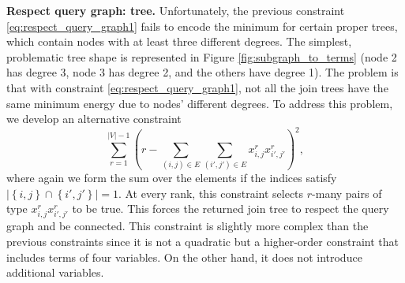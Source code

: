 \textbf{Respect query graph: tree.}
Unfortunately, the previous constraint \eqref{eq:respect_query_graph1} fails to encode the minimum for certain proper trees, which contain nodes with at least three different degrees. The simplest, problematic tree shape is represented in Figure \ref{fig:subgraph_to_terms} (node 2 has degree 3, node 3 has degree 2, and the others have degree 1). The problem is that with constraint \eqref{eq:respect_query_graph1}, not all the join trees have the same minimum energy due to nodes' different degrees. To address this problem, we develop an alternative constraint
\begin{equation*}
    \sum_{r = 1}^{|V| - 1} \left( r - \sum_{(i,j) \in E}\sum_{(i',j') \in E} x_{i,j}^{r}x_{i',j'}^{r}\right)^2,
\end{equation*}
where again we form the sum over the elements if the indices satisfy $|\left\{ i, j \right\} \cap \left\{ i', j' \right\}| = 1$. At every rank, this constraint selects $r$-many pairs of type $x_{i,j}^{r}x_{i',j'}^{r}$ to be true. This forces the returned join tree to respect the query graph and be connected. This constraint is slightly more complex than the previous constraints since it is not a quadratic but a higher-order constraint that includes terms of four variables. On the other hand, it does not introduce additional variables.
